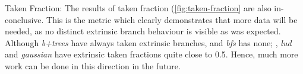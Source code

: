\par{Taken Fraction: The results of taken fraction (\ref{fig:taken-fraction} are also in-conclusive. This is the metric which clearly demonstrates that more data will be needed, as no distinct extrinsic branch behaviour is visible as was expected. Although \textsl{b+trees} have always taken extrinsic branches, and \textsl{bfs} has none; , \textsl{lud} and \textsl{gaussian} have extrinsic taken fractions quite close to 0.5. Hence, much more work can be done in this direction in the future.
}
